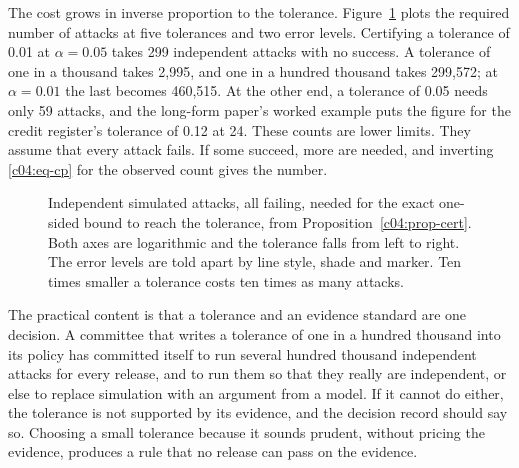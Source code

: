 The cost grows in inverse proportion to the tolerance. Figure~\ref{c04:fig-cost} plots
the required number of attacks at five tolerances and two error levels. Certifying a
tolerance of 0.01 at $\alpha = 0.05$ takes 299 independent attacks with no success. A
tolerance of one in a thousand takes 2,995, and one in a hundred thousand takes 299,572;
at $\alpha = 0.01$ the last becomes 460,515.
At the other end, a tolerance of 0.05 needs only 59 attacks, and the long-form paper's
worked example puts the figure for the credit register's tolerance of 0.12 at 24.
These counts are lower limits. They assume that every attack fails. If some succeed,
more are needed, and inverting \eqref{c04:eq-cp} for the observed count gives the number.

\begin{figure}[t]
\centering
\caption{Independent simulated attacks, all failing, needed for the exact one-sided bound
to reach the tolerance, from Proposition~\ref{c04:prop-cert}. Both axes are logarithmic
and the tolerance falls from left to right. The error levels are told apart by line
style, shade and marker. Ten times smaller a tolerance costs ten times as many attacks.}
\label{c04:fig-cost}
\end{figure}

The practical content is that a tolerance and an evidence standard are one decision. A
committee that writes a tolerance of one in a hundred thousand into its policy has
committed itself to run several hundred thousand independent attacks for every release,
and to run them so that they really are independent, or else to replace simulation with
an argument from a model. If it cannot do either, the tolerance is not supported by its
evidence, and the decision record should say so. Choosing a small tolerance because it
sounds prudent, without pricing the evidence, produces a rule that no release can pass
on the evidence.

